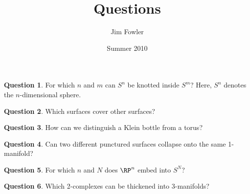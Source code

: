 \documentclass[12pt]{handout}
\title{Questions}
\author{Jim Fowler}
\date{Summer 2010}
\theoremstyle{definition}
\newtheorem{question}{Question}
\begin{document}
\maketitle

\begin{question}
For which $n$ and $m$ can $S^n$ be knotted inside $S^m$?  Here, $S^n$ denotes the $n$-dimensional sphere.
\end{question}

\begin{question}
Which surfaces cover other surfaces?
\end{question}

\begin{question}
How can we distinguish a Klein bottle from a torus?
\end{question}

\begin{question}
Can two different punctured surfaces collapse onto the same 1-manifold?  
\end{question}

\begin{question}
For which $n$ and $N$ does $\RP^n$ embed into $S^N$?
\end{question}

\begin{question}
  Which 2-complexes can be thickened into 3-manifolds?
\end{question}
\end{document}
